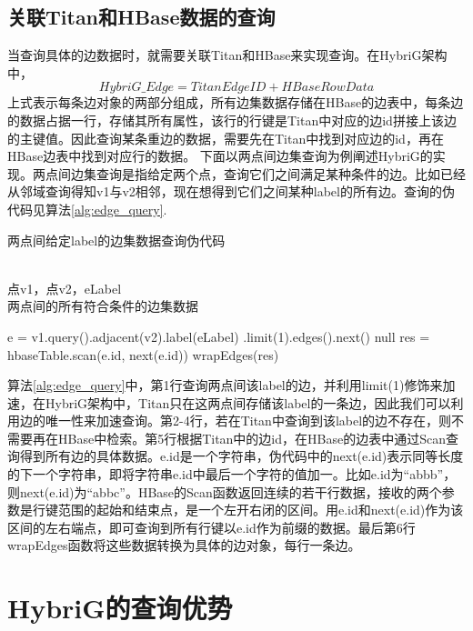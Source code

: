 \subsection{关联Titan和HBase数据的查询}
当查询具体的边数据时，就需要关联Titan和HBase来实现查询。在HybriG架构中，
$$HybriG\_Edge = TitanEdgeID + HBaseRowData$$
上式表示每条边对象的两部分组成，所有边集数据存储在HBase的边表中，每条边的数据占据一行，存储其所有属性，该行的行键是Titan中对应的边id拼接上该边的主键值。因此查询某条重边的数据，需要先在Titan中找到对应边的id，再在HBase边表中找到对应行的数据。
下面以两点间边集查询为例阐述HybriG的实现。两点间边集查询是指给定两个点，查询它们之间满足某种条件的边。比如已经从邻域查询得知v1与v2相邻，现在想得到它们之间某种label的所有边。查询的伪代码见算法\ref{alg:edge_query}.
\begin{algorithm}
\caption{两点间给定label的边集数据查询伪代码}
\label{alg:edge_query}
\begin{algorithmic}[1] %
\REQUIRE ~~\\
点v1，点v2，eLabel
\ENSURE ~~\\
两点间的所有符合条件的边集数据

\STATE e = v1.query().adjacent(v2).label(eLabel)
.limit(1).edges().next()
\RETURN null
\ENDIF
\STATE res = hbaseTable.scan(e.id, next(e.id))
\RETURN wrapEdges(res)
\end{algorithmic}
\end{algorithm}

算法\ref{alg:edge_query}中，第1行查询两点间该label的边，并利用limit(1)修饰来加速，在HybriG架构中，Titan只在这两点间存储该label的一条边，因此我们可以利用边的唯一性来加速查询。第2-4行，若在Titan中查询到该label的边不存在，则不需要再在HBase中检索。第5行根据Titan中的边id，在HBase的边表中通过Scan查询得到所有边的具体数据。e.id是一个字符串，伪代码中的next(e.id)表示同等长度的下一个字符串，即将字符串e.id中最后一个字符的值加一。比如e.id为“abbb”，则next(e.id)为“abbc”。HBase的Scan函数返回连续的若干行数据，接收的两个参数是行键范围的起始和结束点，是一个左开右闭的区间。用e.id和next(e.id)作为该区间的左右端点，即可查询到所有行键以e.id作为前缀的数据。最后第6行wrapEdges函数将这些数据转换为具体的边对象，每行一条边。

\section{HybriG的查询优势}
